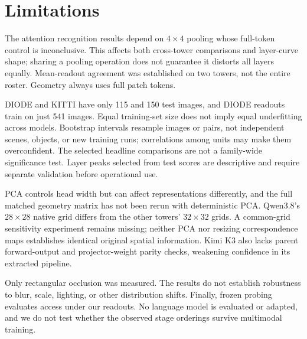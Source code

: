 \section{Limitations}
\label{sec:limitations}
The attention recognition results depend on $4\times4$ pooling whose full-token control
is inconclusive. This affects both cross-tower comparisons and layer-curve shape;
sharing a pooling operation does not guarantee it distorts all layers equally.
Mean-readout agreement was established on two towers, not the entire roster.
Geometry always uses full patch tokens.

DIODE and KITTI have only 115 and 150 test images, and DIODE readouts train on just
541 images. Equal training-set size does not imply equal underfitting across models.
Bootstrap intervals resample images or pairs, not independent scenes, objects, or new
training runs; correlations among units may make them overconfident. The selected
headline comparisons are not a family-wide significance test. Layer peaks selected
from test scores are descriptive and require separate validation before operational use.

PCA controls head width but can affect representations differently, and the full matched
geometry matrix has not been rerun with deterministic PCA. Qwen3.8's $28\times28$
native grid differs from the other towers' $32\times32$ grids. A common-grid sensitivity
experiment remains missing; neither PCA nor resizing correspondence maps establishes
identical original spatial information. Kimi K3 also lacks parent forward-output and
projector-weight parity checks, weakening confidence in its extracted pipeline.

Only rectangular occlusion was measured. The results do not establish robustness to blur,
scale, lighting, or other distribution shifts. Finally, frozen probing evaluates access
under our readouts. No language model is evaluated or adapted, and we do not test
whether the observed stage orderings survive multimodal training.
